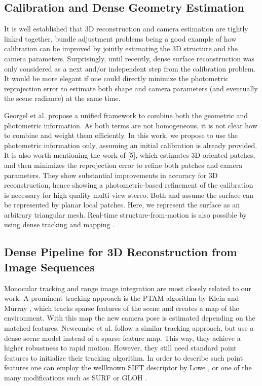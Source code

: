\documentclass{article}
\begin{document}
\subsection{Calibration and Dense Geometry Estimation}

It is well established that 3D reconstruction and camera estimation are tightly linked together, bundle adjustment problems being a good example of how calibration can be improved by jointly estimating the 3D structure and the camera parameters. Surprisingly, until recently, dense surface reconstruction was only considered as a next and/or independent step from the calibration problem. It would be more elegant if one could directly minimize the photometric reprojection
error to estimate both shape and camera parameters (and eventually the scene radiance) at the same time.\par

Georgel et al. \cite{Georgel2008A} propose a unified framework to combine both the geometric and photometric information. As both terms are not homogeneous, it is not clear how to combine and weight them efficiently. In this work, we propose to use the photometric information only, assuming an initial calibration is already provided. It is also worth mentioning the work of [5], which estimates 3D oriented patches, and then minimizes the reprojection error to refine both patches and camera parameters. They show substantial improvements
in accuracy for 3D reconstruction, hence showing a photometric-based refinement of the calibration is necessary for high quality multi-view stereo. Both \cite{Georgel2008A} and \cite{Furukawa2008Accurate} assume the surface can be represented by planar local patches. Here, we represent the surface as an arbitrary triangular mesh. Real-time structure-from-motion is also possible by using dense tracking and mapping \cite{Newcombe2011DTAM}.


\subsection{Dense Pipeline for 3D Reconstruction from Image Sequences}

Monocular tracking and range image integration are most closely related to our work. A prominent tracking approach is the PTAM algorithm by Klein and Murray \cite{Klein2007Parallel}, which tracks sparse features of the scene and creates a map of the environment. With this map the new camera pose is estimated depending on the matched features. Newcombe et al. \cite{Newcombe2011DTAM} follow a similar tracking approach, but use a dense scene model instead of a sparse feature map. This way, they achieve a higher robustness to rapid motion. However, they still need standard point features to initialize their tracking algorithm. In order to describe such point features one can employ the wellknown SIFT descriptor by Lowe \cite{Lowe2004Distinctive}, or one of the many modifications such as SURF \cite{Bay2006SURF} or GLOH \cite{Mikolajczyk2005A}.\par
\end{document}
